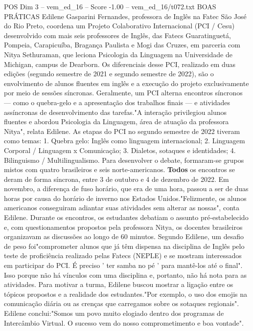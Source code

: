 \begin{textsample}{POS Dim 3 – vem\_ed\_16 – Score -1.00 – vem\_ed\_16/t072.txt}  \label{ex:f3_pos_083}
BOAS PRÁTICAS Edilene Gasparini Fernandes, professora de Inglês na Fatec São José do Rio Preto, coordena um Projeto Colaborativo Internacional (PCI / Cesu) desenvolvido com mais seis professores de Inglês, das Fatecs Guaratinguetá, Pompeia, Carapicuíba, Bragança Paulista e Mogi das Cruzes, em parceria com Nitya Sethuraman, que leciona Psicologia da Linguagem na Universidade de Michigan, campus de Dearborn.
Os diferenciais desse PCI, realizado em duas edições (segundo semestre de 2021 e segundo semestre de 2022), são o envolvimento de alunos fluentes em inglês e a execução do projeto exclusivamente por meio de sessões síncronas.
Geralmente, um PCI alterna encontros síncronos — como o quebra-gelo e a apresentação dos trabalhos finais — e atividades assíncronas de desenvolvimento das tarefas."A interação privilegiou alunos fluentes e abordou Psicologia da Linguagem, área de atuação da professora Nitya", relata Edilene.
As etapas do PCI no segundo semestre de 2022 tiveram como temas: 1.
Quebra gelo: Inglês como linguagem internacional; 2.
Linguagem Corporal / Linguagem x Comunicação; 3.
Dialetos, sotaques e identidades; 4.
Bilinguismo / Multilingualismo.
Para desenvolver o debate, formaram-se grupos mistos com quatro brasileiros e seis norte-americanos. \textbf{Todos} os encontros se deram de forma síncrona, entre 3 de outubro e 4 de dezembro de 2022.
Em novembro, a diferença de fuso horário, que era de uma hora, passou a ser de duas horas por causa do horário de inverno nos Estados Unidos."Felizmente, os alunos americanos conseguiram adiantar suas atividades sem alterar as nossas", conta Edilene.
Durante os encontros, os estudantes debatiam o assunto pré-estabelecido e, com questionamentos propostos pela professora Nitya, os docentes brasileiros organizavam as discussões ao longo de 60 minutos.
Segundo Edilene, um desafio de peso foi"comprometer alunos que já têm dispensa na disciplina de Inglês pelo teste de proficiência realizado pelas Fatecs (NEPLE) e se mostram interessados em participar do PCI.
É preciso ' ter samba no pé ' para mantê-los até o final".
Isso porque não há vínculos com uma disciplina e, portanto, não há nota para as atividades.
Para motivar a turma, Edilene buscou mostrar a ligação entre os tópicos propostos e a realidade dos estudantes."Por exemplo, o uso dos emojis na comunicação diária ou as crenças que carregamos sobre os sotaques regionais".
Edilene conclui:"Somos um povo muito elogiado dentro dos programas de Intercâmbio Virtual.
O sucesso vem do nosso comprometimento e boa vontade".

\end{textsample}
